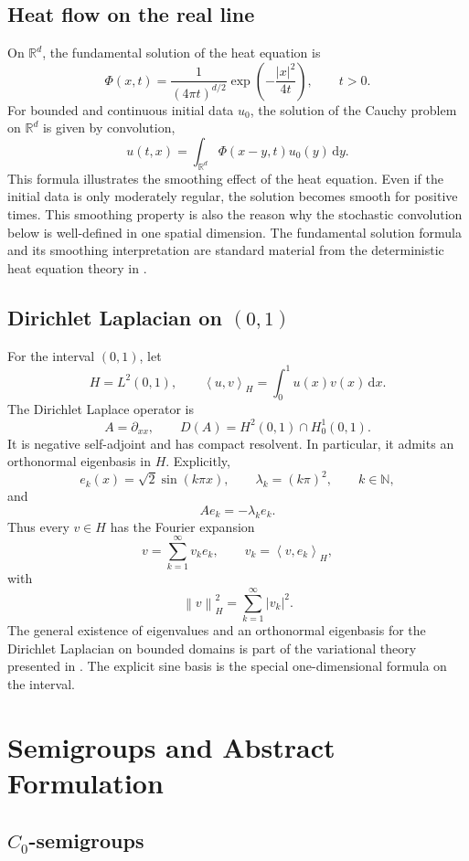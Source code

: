 \documentclass[11pt,a4paper]{article}
\newcommand{\R}{\mathbb{R}}
\newcommand{\N}{\mathbb{N}}
\newcommand{\dd}{\,\mathrm{d}}
\newcommand{\norm}[1]{\left\lVert #1 \right\rVert}
\newcommand{\ip}[2]{\left\langle #1,#2 \right\rangle}
\newcommand{\dom}{D}
\begin{document}
\subsection{Heat flow on the real line}

On \(\R^d\), the fundamental solution of the heat equation is
\[
  \Phi(x,t)=\frac{1}{(4\pi t)^{d/2}}\exp\left(-\frac{|x|^2}{4t}\right),
  \qquad t>0.
\]
For bounded and continuous initial data \(u_0\), the solution of the Cauchy
problem on \(\R^d\) is given by convolution,
\[
  u(t,x)=\int_{\R^d}\Phi(x-y,t)u_0(y)\dd y.
\]
This formula illustrates the smoothing effect of the heat equation. Even if the
initial data is only moderately regular, the solution becomes smooth for
positive times. This smoothing property is also the reason why the stochastic
convolution below is well-defined in one spatial dimension. The fundamental
solution formula and its smoothing interpretation are standard material from
the deterministic heat equation theory in \cite{stinnerPDE1}.

\subsection{\texorpdfstring{Dirichlet Laplacian on \((0,1)\)}{Dirichlet Laplacian on (0,1)}}

For the interval \((0,1)\), let
\[
  H=L^2(0,1),\qquad
  \ip{u}{v}_H=\int_0^1 u(x)v(x)\dd x.
\]
The Dirichlet Laplace operator is
\[
  A=\partial_{xx},\qquad
  \dom(A)=H^2(0,1)\cap H_0^1(0,1).
\]
It is negative self-adjoint and has compact resolvent. In particular, it admits
an orthonormal eigenbasis in \(H\). Explicitly,
\[
  e_k(x)=\sqrt{2}\sin(k\pi x),
  \qquad
  \lambda_k=(k\pi)^2,
  \qquad k\in\N,
\]
and
\[
  Ae_k=-\lambda_k e_k.
\]
Thus every \(v\in H\) has the Fourier expansion
\[
  v=\sum_{k=1}^{\infty} v_k e_k,
  \qquad
  v_k=\ip{v}{e_k}_H,
\]
with
\[
  \norm{v}_H^2=\sum_{k=1}^{\infty}|v_k|^2.
\]
The general existence of eigenvalues and an orthonormal eigenbasis for the
Dirichlet Laplacian on bounded domains is part of the variational theory
presented in \cite{stinnerPDE1}. The explicit sine basis is the special
one-dimensional formula on the interval.

\section{Semigroups and Abstract Formulation}

\subsection{\texorpdfstring{\(C_0\)-semigroups}{C0-semigroups}}
\end{document}
